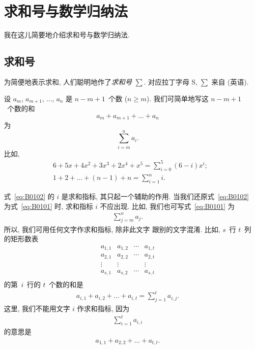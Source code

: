 \documentclass[../libro.tex]{subfiles}
\begin{document}
\ifSubfilesClassLoaded{\appendix}{}

\chapter{求和号与数学归纳法}

我在这儿简要地介绍求和号与数学归纳法.

\clearpage

\section{求和号}

为简便地表示求和,
人们聪明地作了\emph{求和号} \(\sum\).
对应拉丁字母 S, \(\sum\) 来自  (英语).

设 \(a_m\), \(a_{m+1}\), \(\dots\), \(a_n\) 是
\(n - m + 1\)~个数 (\(n \geq m\)).
我们可简单地写这 \(n - m + 1\)~个数的和
\begin{equation}
    a_m + a_{m+1} + \dots + a_n
    \label{eq:B0101}
\end{equation}
为
\begin{equation}
    \sum_{i = m}^{n} {a_i}.
    \label{eq:B0102}
\end{equation}
比如,
\begin{align*}
    & 6 + 5x + 4x^2 + 3x^3 + 2x^4 + x^5
    = \sum_{i = 0}^{5} {(6 - i)x^i};                       \\
    & 1 + 2 + \dots + (n - 1) + n = \sum_{i = 1}^{n} {i}.
\end{align*}

式~\eqref{eq:B0102} 的 \(i\) 是求和指标,
其只起一个辅助的作用.
当我们还原式~\eqref{eq:B0102}
为式~\eqref{eq:B0101} 时,
求和指标 \(i\) 不应出现.
比如, 我们也可写式~\eqref{eq:B0101} 为
\begin{align*}
    \sum_{j = m}^{n} {a_j}.
\end{align*}
所以, 我们可用任何文字作求和指标, 除非此文字%
跟别的文字混淆.
比如, \(s\)~行 \(t\)~列的矩形数表
\begin{equation}
    \begin{matrix}
        a_{1,1} & a_{1,2} & \cdots & a_{1,t} \\
        a_{2,1} & a_{2,2} & \cdots & a_{2,t} \\
        \vdots  & \vdots  & {}     & \vdots  \\
        a_{s,1} & a_{s,2} & \cdots & a_{s,t} \\
    \end{matrix}
    \label{eq:B0103}
\end{equation}
的第~\(i\)~行的 \(t\)~个数的和是
\begin{align*}
    a_{i,1} + a_{i,2} + \dots + a_{i,t}
    = \sum_{j = 1}^{t} {a_{i,j}}.
\end{align*}
这里, 我们不能用文字 \(i\) 作求和指标,
因为
\begin{align*}
    \sum_{i = 1}^{t} {a_{i,i}}
\end{align*}
的意思是
\begin{align*}
    a_{1,1} + a_{2,2} + \dots + a_{t,t}.
\end{align*}
\end{document}
